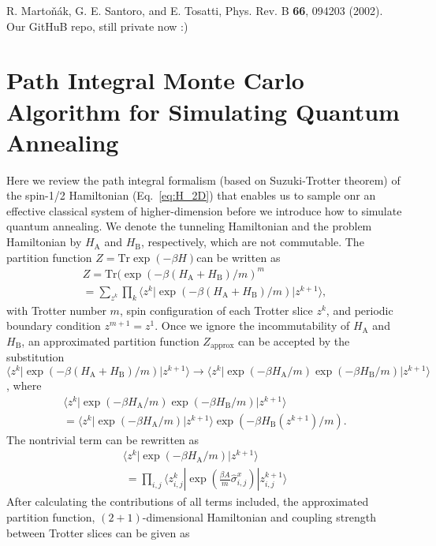 \documentclass[aps,pra,twocolumn,superscriptaddress]{revtex4-2}
\begin{document}
\begin{thebibliography}{99}

 R. Marto\v{n}\'ak, G. E. Santoro, and E. Tosatti, Phys. Rev. B \textbf{66}, 094203 (2002).
Our GitHuB repo, still private now :)


\end{thebibliography}

\appendix
\section{Path Integral Monte Carlo Algorithm for Simulating Quantum Annealing\label{app:QMC}}
Here we review the path integral formalism (based on Suzuki-Trotter theorem) of the spin-1/2 Hamiltonian (Eq.~\eqref{eq:H_2D}) that enables us to sample onr an effective classical system of higher-dimension before we introduce how to simulate quantum annealing. We denote the tunneling Hamiltonian and the problem Hamiltonian by $H_\text{A}$ and $H_\text{B}$, respectively, which are not commutable. The partition function $Z=\text{Tr}\exp(-\beta H)$can be written as
\begin{eqnarray}
Z=\text{Tr}(\exp(-\beta(H_\text{A}+H_\text{B})/m)^m\\
=\sum_{z^k}\prod_{k}\langle z^k|\exp(-\beta(H_\text{A}+H_\text{B})/m)|z^{k+1}\rangle,
\end{eqnarray}
with Trotter number $m$, spin configuration of each Trotter slice $z^k$, and periodic boundary condition $z^{m+1}=z^1$. Once we ignore the incommutability of $H_\text{A}$ and $H_\text{B}$, an approximated partition function $Z_\text{approx}$ can be accepted by the substitution $\langle z^k|\exp(-\beta(H_\text{A}+H_\text{B})/m)|z^{k+1}\rangle\rightarrow\langle z^k|\exp(-\beta H_\text{A}/m)\exp(-\beta H_\text{B}/m)|z^{k+1}\rangle$, where
\begin{eqnarray}
\langle z^k|\exp(-\beta H_\text{A}/m)\exp(-\beta H_\text{B}/m)|z^{k+1}\rangle\\
=\langle z^k|\exp(-\beta H_\text{A}/m)|z^{k+1}\rangle\exp(-\beta H_\text{B}(z^{k+1})/m).
\end{eqnarray}
The nontrivial term can be rewritten as
\begin{eqnarray}
\langle z^k|\exp(-\beta H_\text{A}/m)|z^{k+1}\rangle\\\
=\prod_{i,j}\langle z_{i,j}^k|\exp(\frac{\beta A}{m}\hat{\sigma}_{i,j}^x)|z_{i,j}^{k+1}\rangle
\end{eqnarray}
After calculating the contributions of all terms included, the approximated partition function, $(2+1)$-dimensional Hamiltonian and coupling strength between Trotter slices can be given as
\end{document}
